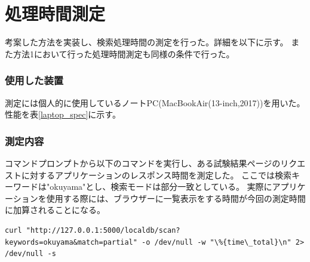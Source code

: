 
\clearpage
\section{処理時間測定} \label{sec:search_process_time_mes}

考案した方法を実装し、検索処理時間の測定を行った。詳細を以下に示す。
また方法1において行った処理時間測定も同様の条件で行った。

\subsubsection{使用した装置}

測定には個人的に使用しているノートPC(MacBookAir(13-inch,2017))を用いた。
性能を表\ref{laptop_spec}に示す。

\begin{table}[tbp]
\caption[測定に使用したノートPCの性能]{測定に使用したノートPC(MacBookAir(13-inch,2017))の性能。検索処理時間の測定に個人的に使用しているノートPCを使用した。}
\label{laptop_spec}
\end{table}

\subsubsection{測定内容}

コマンドプロンプトから以下のコマンドを実行し、ある試験結果ページのリクエストに対するアプリケーションのレスポンス時間を測定した。
ここでは検索キーワードは"okuyama"とし、検索モードは部分一致としている。
実際にアプリケーションを使用する際には、ブラウザーに一覧表示をする時間が今回の測定時間に加算されることになる。

{ \small
\begin{lstlisting}
curl "http://127.0.0.1:5000/localdb/scan?keywords=okuyama&match=partial" -o /dev/null -w "\%{time\_total}\n" 2> /dev/null -s
\end{lstlisting}
}


